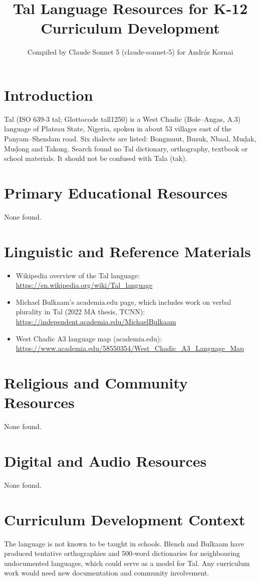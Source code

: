 \documentclass[12pt]{article}
\title{Tal Language Resources for K-12 Curriculum Development}
\author{Compiled by Claude Sonnet 5 (claude-sonnet-5) for Andr\'as Kornai}
\date{}
\begin{document}
\maketitle
\section{Introduction}
Tal (ISO 639-3 tal; Glottocode tall1250) is a West Chadic (Bole--Angas, A.3) language of Plateau State, Nigeria, spoken in about 53 villages east of the Panyam--Shendam road. Six dialects are listed: Bongmuut, Buzuk, Nbaal, Mu\d{d}ak, Mu\d{d}ong and Takong. Search found no Tal dictionary, orthography, textbook or school materials. It should not be confused with Tala (tak).
\section{Primary Educational Resources}
None found.
\section{Linguistic and Reference Materials}
\begin{itemize}
\item Wikipedia overview of the Tal language: \url{https://en.wikipedia.org/wiki/Tal_language}
\item Michael Bulkaam's academia.edu page, which includes work on verbal plurality in Tal (2022 MA thesis, TCNN): \url{https://independent.academia.edu/MichaelBulkaam}
\item West Chadic A3 language map (academia.edu): \url{https://www.academia.edu/58550354/West_Chadic_A3_Language_Map}
\end{itemize}
\section{Religious and Community Resources}
None found.
\section{Digital and Audio Resources}
None found.
\section{Curriculum Development Context}
The language is not known to be taught in schools. Blench and Bulkaam have produced tentative orthographies and 500-word dictionaries for neighbouring undocumented languages, which could serve as a model for Tal. Any curriculum work would need new documentation and community involvement.
\end{document}
